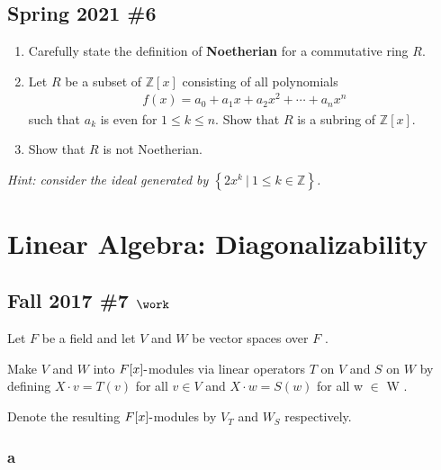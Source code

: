 \hypertarget{spring-2021-6}{%
\subsection{Spring 2021 \#6}\label{spring-2021-6}}

\begin{enumerate}
\def\labelenumi{\alph{enumi}.}
\item
  Carefully state the definition of \textbf{Noetherian} for a
  commutative ring \(R\).
\item
  Let \(R\) be a subset of \({\mathbb{Z}}[x]\) consisting of all
  polynomials
  \begin{align*}
  f(x) = a_ 0 + a_1 x + a_2 x^2 + \cdots + a_nx^n
  \end{align*}
  such that \(a_k\) is even for \(1\leq k \leq n\). Show that \(R\) is a
  subring of \({\mathbb{Z}}[x]\).
\item
  Show that \(R\) is not Noetherian.
\end{enumerate}

\emph{Hint: consider the ideal generated by
\(\left\{{ 2x^k {~\mathrel{\Big|}~}1\leq k \in {\mathbb{Z}}}\right\}\).}

\hypertarget{linear-algebra-diagonalizability}{%
\section{Linear Algebra:
Diagonalizability}\label{linear-algebra-diagonalizability}}

\hypertarget{fall-2017-7-work}{%
\subsection{\texorpdfstring{Fall 2017 \#7
\(\work\)}{Fall 2017 \#7 \textbackslash work}}\label{fall-2017-7-work}}

Let \(F\) be a field and let \(V\) and \(W\) be vector spaces over \(F\)
.

Make \(V\) and \(W\) into \(F[x]{\hbox{-}}\)modules via linear operators
\(T\) on \(V\) and \(S\) on \(W\) by defining \(X \cdot v = T (v)\) for
all \(v \in V\) and \(X \cdot w = S(w)\) for all w \(\in\) W .

Denote the resulting \(F[x]{\hbox{-}}\)modules by \(V_T\) and \(W_S\)
respectively.

\hypertarget{a-96}{%
\subsubsection{a}\label{a-96}}

